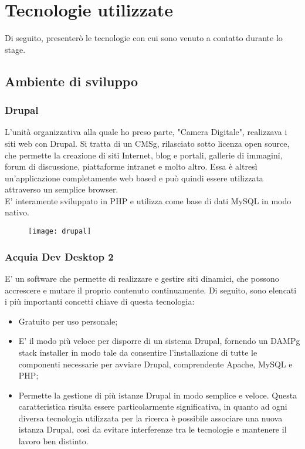 \section{Tecnologie utilizzate}
\label{sec:tecnologie_utilizzate}
Di seguito, presenterò le tecnologie con cui sono venuto a contatto durante lo stage.
	
	\subsection{Ambiente di sviluppo}
	
		\subsubsection{Drupal}
		L'unità organizzativa alla quale ho preso parte, "Camera Digitale", realizzava i siti web con \gls{Drupal}. Si tratta di un \gls{CMSg}, rilasciato sotto licenza \gls{open source}, che permette la creazione di siti Internet, blog e portali, gallerie di immagini, forum di discussione, piattaforme intranet e molto altro. Essa è altresì un’applicazione completamente web based e può quindi essere utilizzata attraverso un semplice browser. \\
		E' interamente sviluppato in \gls{PHP} e utilizza come base di dati \gls{MySQL} in modo nativo.
		
		\begin{figure}[htbp]
			\begin{center}
				\texttt{[image: drupal]}
			\end{center}
		\end{figure}
	
		\subsubsection{Acquia Dev Desktop 2}
		E’ un software che permette di realizzare e gestire siti dinamici, che possono accrescere e mutare il proprio contenuto continuamente.
		Di seguito, sono elencati i più importanti concetti chiave di questa tecnologia:
		\begin{itemize}
			\item {Gratuito per uso personale;}
			\item {E' il modo più veloce per disporre di un sistema \gls{Drupal}, fornendo un \gls{DAMPg} stack installer in modo tale da consentire l'installazione di tutte le componenti necessarie per avviare \gls{Drupal}, comprendente \gls{Apache}, \gls{MySQL} e \gls{PHP};}
			\item {Permette la gestione di più istanze \gls{Drupal} in modo semplice e veloce. Questa caratteristica risulta essere particolarmente significativa, in quanto ad ogni diversa tecnologia utilizzata per la ricerca è possibile associare una nuova istanza \gls{Drupal}, così da evitare interferenze tra le tecnologie e mantenere il lavoro ben distinto.}
		\end{itemize}
	
